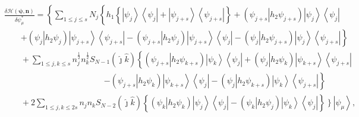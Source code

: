 \documentclass[aps,preprint]{revtex4}%
\begin{document}
\begin{align}
&  \frac{\delta\mathcal{H}\left(  \mathbf{\psi,n}\right)  }{\delta\psi_{\mu
}^{\ast}}=\left\{  \sum_{1\leq j\leq s}N_{j}\left\{  h_{1}\left\{  \left\vert
\psi_{j}\right\rangle \left\langle \psi_{j}\right\vert +\left\vert \psi
_{j+s}\right\rangle \left\langle \psi_{j+s}\right\vert \right\}  +\left(
\left.  \psi_{j+s}\right\vert h_{2}\psi_{j+s}\right)  \left\vert \psi
_{j}\right\rangle \left\langle \psi_{j}\right\vert \right.  \right.
\nonumber\\
&  \qquad\left.  +\left(  \left.  \psi_{j}\right\vert h_{2}\psi_{j}\right)
\left\vert \psi_{j+s}\right\rangle \left\langle \psi_{j+s}\right\vert -\left(
\left.  \psi_{j+s}\right\vert h_{2}\psi_{j}\right)  \left\vert \psi
_{j+s}\right\rangle \left\langle \psi_{j}\right\vert -\left(  \left.  \psi
_{j}\right\vert h_{2}\psi_{j+s}\right)  \left\vert \psi_{j}\right\rangle
\left\langle \psi_{j+s}\right\vert \right\}  \nonumber\\
&  \qquad+\sum_{1\leq j,k\leq s}n_{j}^{\frac{1}{2}}n_{k}^{\frac{1}{2}}%
S_{N-1}\left(  \hat{\jmath}\hat{k}\right)  \left\{  \left(  \left.  \psi
_{j+s}\right\vert h_{2}\psi_{k+s}\right)  \left\vert \psi_{k}\right\rangle
\left\langle \psi_{j}\right\vert +\left(  \left.  \psi_{j}\right\vert
h_{2}\psi_{k}\right)  \left\vert \psi_{k+s}\right\rangle \left\langle
\psi_{j+s}\right\vert \right.  \nonumber\\
&  \qquad\qquad\qquad\qquad\qquad\qquad\left.  -\left(  \left.  \psi
_{j+s}\right\vert h_{2}\psi_{k}\right)  \left\vert \psi_{k+s}\right\rangle
\left\langle \psi_{j}\right\vert -\left(  \left.  \psi_{j}\right\vert
h_{2}\psi_{k+s}\right)  \left\vert \psi_{k}\right\rangle \left\langle
\psi_{j+s}\right\vert \right\}  \nonumber\\
&  \qquad+2\sum_{1\leq j,k\leq2s}n_{j}n_{k}S_{N-2}\left(  \hat{\jmath}\hat
{k}\right)  \left\{  \left(  \left.  \psi_{k}\right\vert h_{2}\psi_{k}\right)
\left\vert \psi_{j}\right\rangle \left\langle \psi_{j}\right\vert -\left(
\left.  \psi_{k}\right\vert h_{2}\psi_{j}\right)  \left\vert \psi
_{k}\right\rangle \left\langle \psi_{j}\right\vert \right\}  \left.
\overset{}{}\right\}  \left\vert \psi_{\mu}\right\rangle ,
\end{align}%
\end{document}
